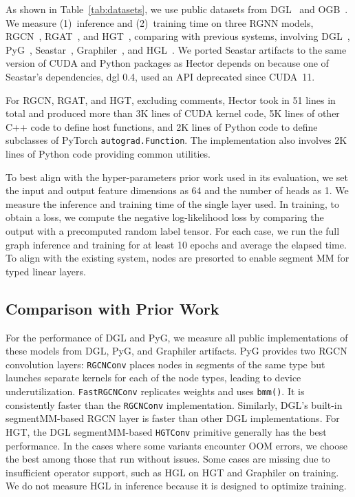 As shown in Table~\ref{tab:datasets}, we use public datasets from DGL~\cite{wang2019deep} and OGB~\cite{huOpenGraphBenchmark2021}.
We measure (1)~inference and (2)~training time on three RGNN models,  RGCN~\cite{rgcn}, RGAT~\cite{busbridge2019relational}, and HGT~\cite{hgt}, comparing with previous systems, involving DGL~\cite{wang2019deep}, PyG~\cite{fey2019fast}, Seastar~\cite{wuSeastarVertexcentricProgramming2021}, Graphiler~\cite{xieGraphilerCompilerGraph}, and HGL~\cite{guiHGLAcceleratingHeterogeneous}.
We ported Seastar artifacts to the same version of CUDA and Python packages as Hector depends on because one of Seastar's dependencies, dgl 0.4, used an API deprecated since CUDA~11.


For RGCN, RGAT, and HGT, excluding comments, Hector took in 51 lines in total and produced more than 3K lines of CUDA kernel code, 5K lines of other C++ code to define host functions, and 2K lines of Python code to define subclasses of PyTorch \texttt{autograd.Function}. The implementation also involves 2K lines of Python code providing common utilities. 


To best align with the hyper-parameters prior work used in its evaluation, we set the input and output feature dimensions as 64 and the number of heads as 1. 
We measure the inference and training time of the single layer used. 
In training, to obtain a loss, we compute the negative log-likelihood loss by comparing the output with a precomputed random label tensor. 
For each case, we run the full graph inference and training for at least 10 epochs and average the elapsed time.
To align with the existing system, nodes are presorted to enable segment MM for typed linear layers.



\subsection{Comparison with Prior Work}
\label{sec:baseline_eval}


For the performance of DGL and PyG, we measure all public implementations of these models from DGL, PyG, and Graphiler artifacts.
PyG provides two RGCN convolution layers: \texttt{RGCNConv} places nodes in segments of the same type but launches separate kernels for each of the node types, leading to device underutilization.
\texttt{FastRGCNConv} replicates weights and uses \texttt{bmm()}. It is consistently faster than the \texttt{RGCNConv} implementation.
Similarly, DGL's built-in segmentMM-based RGCN layer is faster than other DGL implementations.
For HGT, the DGL segmentMM-based \texttt{HGTConv} primitive generally has the best performance.
In the cases where some variants encounter OOM errors, we choose the best among those that run without issues.
Some cases are missing due to insufficient operator support, such as HGL on HGT and Graphiler on training. We do not measure HGL in inference because it is designed to optimize training.



